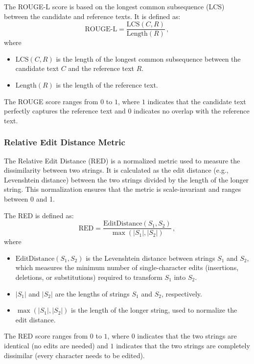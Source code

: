 The ROUGE-L score is based on the longest common subsequence (LCS) between the candidate and reference texts. It is defined as:
\[
\text{ROUGE-L} = \frac{\text{LCS}(C, R)}{\text{Length}(R)}\,,
\]
where
\begin{itemize}
    \vspace{-0.5em}
    \item \( \text{LCS}(C, R) \) is the length of the longest common subsequence between the candidate text \( C \) and the reference text \( R \).
    \vspace{-0.5em}
    \item \( \text{Length}(R) \) is the length of the reference text.
\end{itemize}
The ROUGE score ranges from $0$ to $1$, where $1$ indicates that the candidate text perfectly captures the reference text and $0$ indicates no overlap with the reference text.

\subsubsection{Relative Edit Distance Metric}
The Relative Edit Distance (RED) is a normalized metric used to measure the dissimilarity between two strings. It is calculated as the edit distance (e.g., Levenshtein distance) between the two strings divided by the length of the longer string. This normalization ensures that the metric is scale-invariant and ranges between 0 and 1.

The RED is defined as:
\[
\text{RED} = \frac{\text{EditDistance}(S_1, S_2)}{\max(|S_1|, |S_2|)}\,,
\]
where
\begin{itemize}
    \item \( \text{EditDistance}(S_1, S_2) \) is the Levenshtein distance between strings \( S_1 \) and \( S_2 \), which measures the minimum number of single-character edits (insertions, deletions, or substitutions) required to transform \( S_1 \) into \( S_2 \).
    \vspace{-0.5em}
    \item \( |S_1| \) and \( |S_2| \) are the lengths of strings \( S_1 \) and \( S_2 \), respectively.
    \vspace{-0.5em}
    \item \( \max(|S_1|, |S_2|) \) is the length of the longer string, used to normalize the edit distance.
\end{itemize}
The RED score ranges from $0$ to $1$, where $0$ indicates that the two strings are identical (no edits are needed) and $1$ indicates that the two strings are completely dissimilar (every character needs to be edited).

